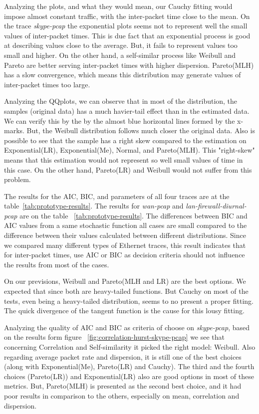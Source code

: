 Analyzing the plots, and what they would mean, our Cauchy fitting would impose almost constant traffic, with the inter-packet time close to the mean. On the trace \textit{skype-pcap} the exponential plots seems not to represent well the small values of inter-packet times. This is due fact that an exponential process is good at describing values close to the average. But, it fails to represent values too small and higher. On the other hand, a self-similar process like Weibull and Pareto are better serving inter-packet times with higher dispersion. Pareto(MLH) has a slow convergence, which means this distribution may generate values of inter-packet times too large. 

Analyzing the QQplots, we can observe that in most of the distribution, the samples (original data) has a much havier-tail effect than in the estimated data. We can verify this by the by the almost blue horizontal lines formed by the x-marks. But, the Weibull distribution follows much closer the original data. Also is possible to see that the sample has a right skew compared to the estimation on Exponential(LR), Exponential(Me), Normal, and Pareto(MLH). This "right-skew" means that this estimation would not represent so well small values of time in this case. On the other hand, Pareto(LR) and Weibull would not suffer from this problem.

The results for the AIC, BIC, and parameters of all four traces are at the table~\ref{tab:prototype-results}.  The results for \textit{wan-pcap} and \textit{lan-firewall-diurnal-pcap} are on the table ~\ref{tab:prototype-results}. The differences between BIC and AIC values from a same stochastic function all cases are small compared to the difference between their values calculated between different distributions. Since we compared many different types of Ethernet traces, this result indicates that for inter-packet times, use AIC or BIC as decision criteria should not influence the results from most of the cases. 

On our previsions, Weibull and Pareto(MLH and LR) are the best options. We expected that since both are heavy-tailed functions. But Cauchy on most of the tests, even being a heavy-tailed distribution, seems to no present a proper fitting. The quick divergence of the tangent function is the cause for this lousy fitting.

Analyzing the quality of AIC and BIC as criteria of choose on \textit{skype-pcap}, based on the results form figure ~\ref{fig:correlation-hurst-skype-pcap} we see that concerning Correlation and Self-similarity it picked the right model: Weibull. Also regarding average packet rate and dispersion, it is still one of the best choices (along with Exponential(Me), Pareto(LR) and Cauchy). The third and the fourth choices (Pareto(LR)) and Exponential(LR) also are good options in most of these metrics. But, Pareto(MLH) is presented as the second best choice, and it had poor results in comparison to the others, especially on mean, correlation and dispersion. 

